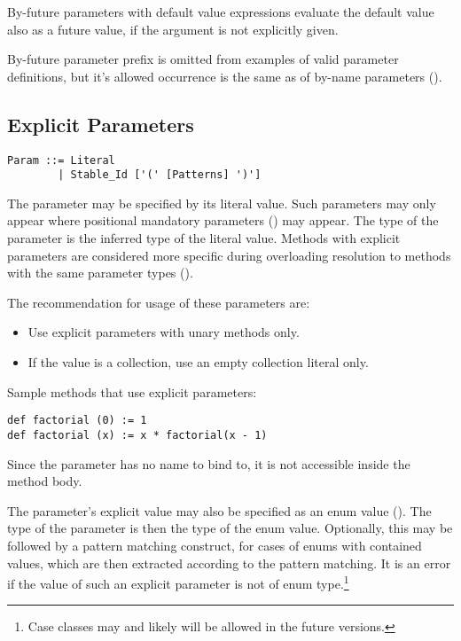 By-future parameters with default value expressions evaluate the default value also as a future value, if the argument is not explicitly given. 

By-future parameter prefix is omitted from examples of valid parameter definitions, but it's allowed occurrence is the same as of by-name parameters (). 





\subsection{Explicit Parameters}
\label{sec:explicit-parameters}

\syntax\begin{lstlisting}
Param ::= Literal 
        | Stable_Id ['(' [Patterns] ')']
\end{lstlisting}

The parameter may be specified by its literal value. Such parameters may only appear where positional mandatory parameters () may appear. The type of the parameter is the inferred type of the literal value. Methods with explicit parameters are considered more specific during overloading resolution to methods with the same parameter types (). 

The recommendation for usage of these parameters are: 
\begin{itemize}
  \item Use explicit parameters with unary methods only. 
  \item If the value is a collection, use an empty collection literal only. 
\end{itemize}

\example Sample methods that use explicit parameters:
\begin{lstlisting}
def factorial (0) := 1
def factorial (x) := x * factorial(x - 1)
\end{lstlisting}

Since the parameter has no name to bind to, it is not accessible inside the method body. 

The parameter's explicit value may also be specified as an enum value (). The type of the parameter is then the type of the enum value. Optionally, this may be followed by a pattern matching construct, for cases of enums with contained values, which are then extracted according to the pattern matching. It is an error if the value of such an explicit parameter is not of enum type.\footnote{Case classes may and likely will be allowed in the future versions.} %






